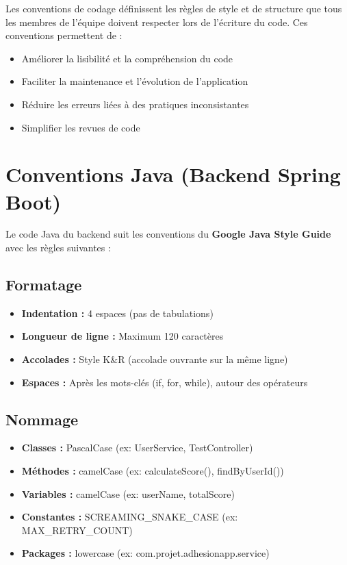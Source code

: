 \documentclass[12pt,a4paper]{report}
\begin{document}
Les conventions de codage définissent les règles de style et de structure que tous les membres de l'équipe doivent respecter lors de l'écriture du code. Ces conventions permettent de :

\begin{itemize}
    \item Améliorer la lisibilité et la compréhension du code
    \item Faciliter la maintenance et l'évolution de l'application
    \item Réduire les erreurs liées à des pratiques inconsistantes
    \item Simplifier les revues de code
\end{itemize}

\section{Conventions Java (Backend Spring Boot)}

Le code Java du backend suit les conventions du \textbf{Google Java Style Guide} avec les règles suivantes :

\subsection{Formatage}

\begin{itemize}
    \item \textbf{Indentation :} 4 espaces (pas de tabulations)
    \item \textbf{Longueur de ligne :} Maximum 120 caractères
    \item \textbf{Accolades :} Style K\&R (accolade ouvrante sur la même ligne)
    \item \textbf{Espaces :} Après les mots-clés (if, for, while), autour des opérateurs
\end{itemize}

\subsection{Nommage}

\begin{itemize}
    \item \textbf{Classes :} PascalCase (ex: UserService, TestController)
    \item \textbf{Méthodes :} camelCase (ex: calculateScore(), findByUserId())
    \item \textbf{Variables :} camelCase (ex: userName, totalScore)
    \item \textbf{Constantes :} SCREAMING\_SNAKE\_CASE (ex: MAX\_RETRY\_COUNT)
    \item \textbf{Packages :} lowercase (ex: com.projet.adhesionapp.service)
\end{itemize}
\end{document}

